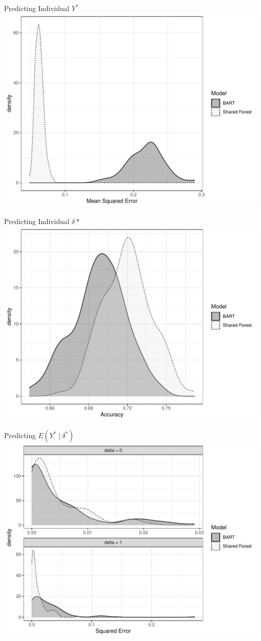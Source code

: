 \documentclass{beamer}
\begin{document}
\begin{frame}{Predicting Individual $Y^*$ }
\includegraphics[width = .9\linewidth]{continuous_sim_results_ind_y.pdf}
\end{frame}

\begin{frame}{Predicting Individual $\delta*$}
\includegraphics[width = .9\linewidth]{continuous_sim_results_ind_delta.pdf}
\end{frame}


\begin{frame}{Predicting $E(Y^* \mid \delta^*)$ }
\includegraphics[width = .9\linewidth]{continuous_sim_results.pdf}
\end{frame}
\end{document}
